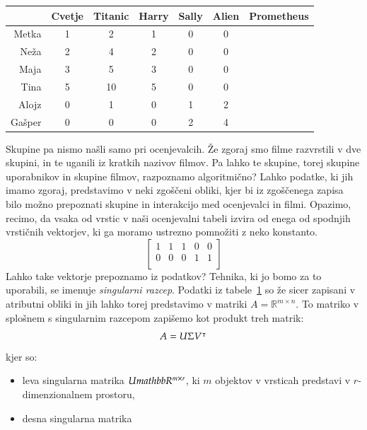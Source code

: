 \begin{table}
\begin{tabular}{rcccccc}
\toprule
 & Cvetje & Titanic & Harry & Sally & Alien & Prometheus \\
\midrule
Metka & 1 & 2 & 1 & 0 & 0 \\
Neža & 2 & 4 & 2 & 0 & 0 \\
Maja & 3 & 5 & 3 & 0 & 0 \\
Tina & 5 & 10 & 5 & 0 & 0 \\
Alojz & 0 & 1 & 0 & 1 & 2 \\
Gašper & 0 & 0 & 0 & 2 & 4 \\
\bottomrule
\end{tabular}
\label{t:romance-sf}
\end{table}

Skupine pa nismo našli samo pri ocenjevalcih. Že zgoraj smo filme razvrstili v dve skupini, in te uganili iz kratkih nazivov filmov. Pa lahko te skupine, torej skupine uporabnikov in skupine filmov, razpoznamo algoritmično? Lahko podatke, ki jih imamo zgoraj, predstavimo v neki zgoščeni obliki, kjer bi iz zgoščenega zapisa bilo možno prepoznati skupine in interakcijo med ocenjevalci in filmi. Opazimo, recimo, da vsaka od vrstic v naši ocenjevalni tabeli izvira od enega od spodnjih vrstičnih vektorjev, ki ga moramo ustrezno pomnožiti z neko konstanto. 
% 
$$
\begin{bmatrix}
1 & 1 & 1 & 0 & 0 \\
0 & 0 & 0 & 1 & 1 \\
\end{bmatrix}
$$
Lahko take vektorje prepoznamo iz podatkov? Tehnika, ki jo bomo za to uporabili, se imenuje {\em singularni razcep}. Podatki iz tabele~\ref{t:romance-sf} so že sicer zapisani v atributni obliki in jih lahko torej predstavimo v matriki $A=\mathbb{R}^{m\times n}$. To matriko v splošnem s singularnim razcepom zapišemo kot produkt treh matrik:
\begin{equation}
A = U\Sigma V^\intercal
\end{equation}
kjer so:
\begin{itemize}
\item leva singularna matrika $U\\mathbb{R}^{m\times r}$, ki $m$ objektov v vrsticah predstavi v $r$-dimenzionalnem prostoru,
\item desna singularna matrika 
\end{itemize}

